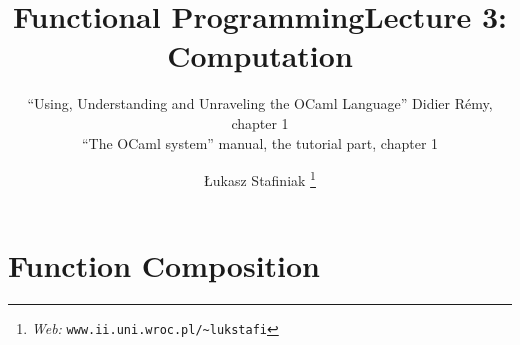 \documentclass{beamer}
\newcommand{\tmfnhomepage}[1]{\thanks{\textit{Web:} \texttt{#1}}}
\begin{document}
\title{Functional Programming}

\author{
  {\L}ukasz Stafiniak
  \tmfnhomepage{www.ii.uni.wroc.pl/\~{}lukstafi}
}


\maketitle

\title{Lecture 3: Computation}

\subtitle{{\scriptsize{``Using, Understanding and Unraveling the OCaml
Language'' Didier R{\'e}my, chapter 1\\
``The OCaml system'' manual, the tutorial part, chapter 1}}}

\maketitle

{\newpage}

\section{Function Composition}
\end{document}
